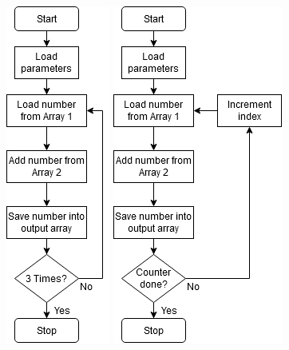 \documentclass[12pt]{article}
\begin{document}
    \begin{center}
    \includegraphics[scale = 0.5]{Lab2/flowchart.png}
    \includegraphics[scale = 0.5]{Lab2/flowchart2.png}

\end{center}
\end{document}

